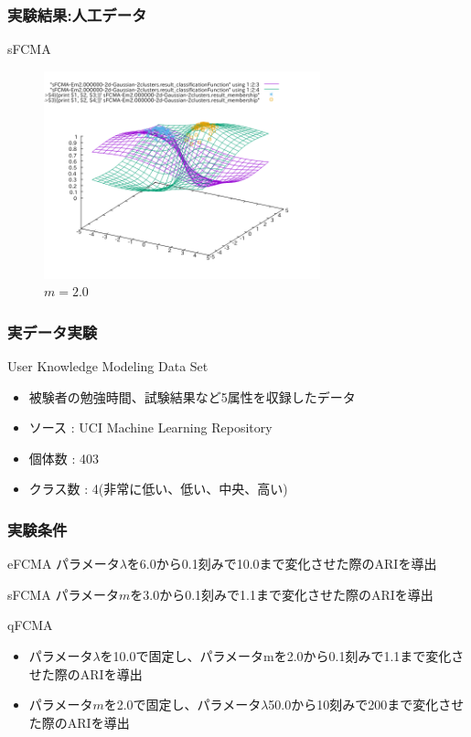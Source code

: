 \documentclass[13pt,dvipdfmx]{beamer}
\begin{document}
\begin{frame}\frametitle{実験結果:人工データ}
  \begin{block}{sFCMA}
   \begin{figure}[htbp]
    \begin{center}
    \includegraphics[height=60mm]{sFCMA-Em2.png}
   \end{center}
    \captionsetup{labelformat=empty,labelsep=none}
   \caption{$m=2.0$}
  \end{figure}
 \end{block}
\end{frame}

\begin{frame}\frametitle{実データ実験}
  \begin{block}{User Knowledge Modeling Data Set}
    \begin{itemize}
    \item 被験者の勉強時間、試験結果など5属性を収録したデータ
    \item ソース : UCI  Machine Learning Repository
    \item 個体数 : 403
    \item クラス数 : 4(非常に低い、低い、中央、高い)
    \end{itemize}
  \end{block}
\end{frame}


\begin{frame}\frametitle{実験条件}
\begin{block}{eFCMA}
  パラメータ$\lambda$を6.0から0.1刻みで10.0まで変化させた際のARIを導出
\end{block}
\begin{block}{sFCMA}
  パラメータ$m$を3.0から0.1刻みで1.1まで変化させた際のARIを導出
\end{block}
\begin{block}{qFCMA}
  \begin{itemize}
  \item パラメータ$\lambda$を10.0で固定し、パラメータmを2.0から0.1刻みで1.1まで変化させた際のARIを導出
  \item パラメータ$m$を2.0で固定し、パラメータ$\lambda$50.0から10刻みで200まで変化させた際のARIを導出
  \end{itemize}
\end{block}
\end{frame}
\end{document}
